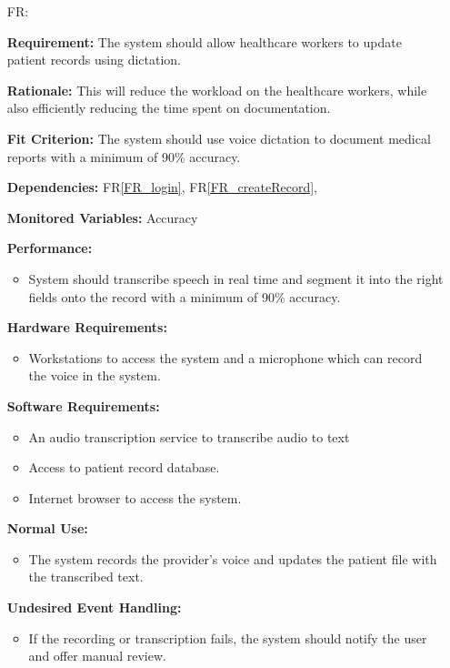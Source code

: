 \documentclass[12pt]{article}
\newcounter{reqnum} %
\begin{document}
\begin{itemize}
\item[FR\refstepcounter{reqnum}\thereqnum \label{FR_DictationRecording}:]

\textbf{Requirement:} The system should allow healthcare workers to update patient records using dictation. 
    
\textbf{Rationale:} This will reduce the workload on the healthcare workers, while also efficiently reducing the time spent on documentation. 
    
\textbf{Fit Criterion:} The system should use voice dictation to document medical reports with a minimum of 90\% accuracy. 
    
\textbf{Dependencies:} FR\ref{FR_login}, FR\ref{FR_createRecord}, 
    
\textbf{Monitored Variables:} Accuracy
    
\textbf{Performance:} 
  \begin{itemize}
      \item System should transcribe speech in real time and segment it into the right fields onto the record with a minimum of 90\% accuracy.
  \end{itemize}
    
\textbf{Hardware Requirements:}
  \begin{itemize}
      \item Workstations to access the system and a microphone which can record the voice in the system. 
  \end{itemize}
    
\textbf{Software Requirements:}
  \begin{itemize}
      \item An audio transcription service to transcribe audio to text 
      \item Access to patient record database. 
      \item Internet browser to access the system.  
  \end{itemize}
    
\textbf{Normal Use:} 
\begin{itemize}
  \item The system records the provider's voice and updates the patient file with the transcribed text.
\end{itemize}
    
\textbf{Undesired Event Handling:} 
\begin{itemize}
  \item If the recording or transcription fails, the system should notify the user and offer manual review.
\end{itemize}



\end{itemize}
\end{document}
